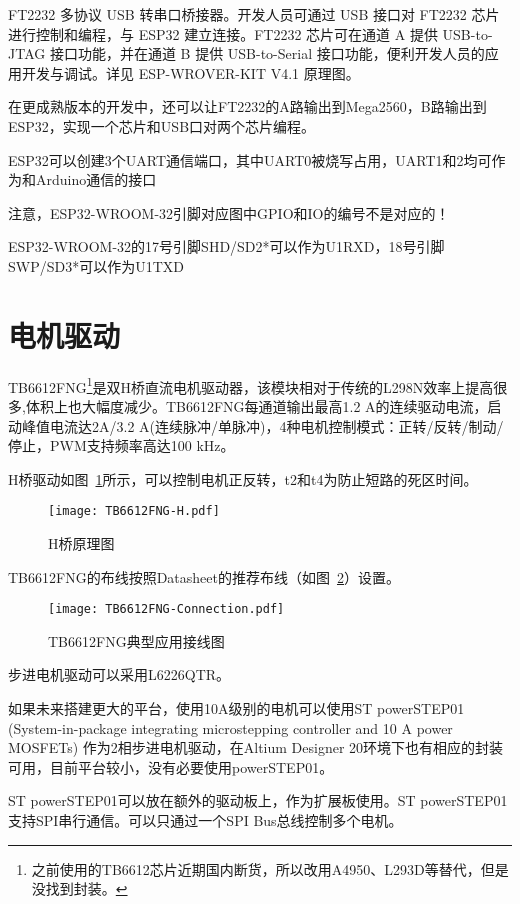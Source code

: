 FT2232 多协议 USB 转串口桥接器。开发人员可通过 USB 接口对 FT2232 芯片进行控制和编程，与 ESP32 建立连接。FT2232 芯片可在通道 A 提供 USB-to-JTAG 接口功能，并在通道 B 提供 USB-to-Serial 接口功能，便利开发人员的应用开发与调试。详见 ESP-WROVER-KIT V4.1 原理图。

在更成熟版本的开发中，还可以让FT2232的A路输出到Mega2560，B路输出到ESP32，实现一个芯片和USB口对两个芯片编程。

ESP32可以创建3个UART通信端口，其中UART0被烧写占用，UART1和2均可作为和Arduino通信的接口

注意，ESP32-WROOM-32引脚对应图中GPIO和IO的编号不是对应的！

ESP32-WROOM-32的17号引脚SHD/SD2*可以作为U1RXD，18号引脚SWP/SD3*可以作为U1TXD 
\section{电机驱动}

TB6612FNG\footnote{之前使用的TB6612芯片近期国内断货，所以改用A4950、L293D等替代，但是没找到封装。}是双H桥直流电机驱动器，该模块相对于传统的L298N效率上提高很多,体积上也大幅度减少。TB6612FNG每通道输出最高1.2 A的连续驱动电流，启动峰值电流达2A/3.2 A(连续脉冲/单脉冲)，4种电机控制模式：正转/反转/制动/停止，PWM支持频率高达100 kHz。

H桥驱动如图~\ref{fig:TB6612FNG-H}所示，可以控制电机正反转，t2和t4为防止短路的死区时间。

\begin{figure}[htbp]
    \centering
    \texttt{[image: TB6612FNG-H.pdf]}
    \caption{H桥原理图}
    \label{fig:TB6612FNG-H}
\end{figure}

TB6612FNG的布线按照Datasheet的推荐布线（如图~\ref{fig:TB6612FNG-Connection}）设置。

\begin{figure}[htbp]
    \centering
    \texttt{[image: TB6612FNG-Connection.pdf]}
    \caption{TB6612FNG典型应用接线图}
    \label{fig:TB6612FNG-Connection}
\end{figure}

步进电机驱动可以采用L6226QTR。

如果未来搭建更大的平台，使用10A级别的电机可以使用ST powerSTEP01 (System-in-package integrating microstepping controller and
10 A power MOSFETs) 作为2相步进电机驱动，在Altium Designer 20环境下也有相应的封装可用，目前平台较小，没有必要使用powerSTEP01。

ST powerSTEP01可以放在额外的驱动板上，作为扩展板使用。ST powerSTEP01支持SPI串行通信。可以只通过一个SPI Bus总线控制多个电机。

